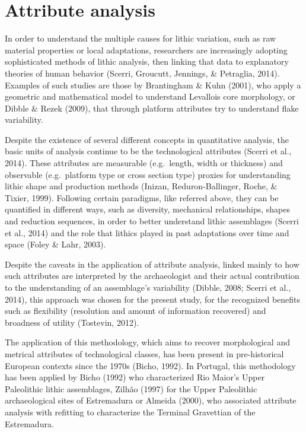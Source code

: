 \documentclass[12pt,twoside]{reedthesis}
\begin{document}
\hypertarget{attribute-analysis}{%
\section{Attribute analysis}\label{attribute-analysis}}

In order to understand the multiple causes for lithic variation, such as raw material properties or local adaptations, researchers are increasingly adopting sophisticated methods of lithic analysis, then linking that data to explanatory theories of human behavior (Scerri, Groucutt, Jennings, \& Petraglia, 2014). Examples of such studies are those by Brantingham \& Kuhn (2001), who apply a geometric and mathematical model to understand Levallois core morphology, or Dibble \& Rezek (2009), that through platform attributes try to understand flake variability.

Despite the existence of several different concepts in quantitative analysis, the basic units of analysis continue to be the technological attributes (Scerri et al., 2014). These attributes are measurable (e.g.~length, width or thickness) and observable (e.g.~platform type or cross section type) proxies for understanding lithic shape and production methods (Inizan, Reduron-Ballinger, Roche, \& Tixier, 1999). Following certain paradigms, like referred above, they can be quantified in different ways, such as diversity, mechanical relationships, shapes and reduction sequences, in order to better understand lithic assemblages (Scerri et al., 2014) and the role that lithics played in past adaptations over time and space (Foley \& Lahr, 2003).

Despite the caveats in the application of attribute analysis, linked mainly to how such attributes are interpreted by the archaeologist and their actual contribution to the understanding of an assemblage's variability (Dibble, 2008; Scerri et al., 2014), this approach was chosen for the present study, for the recognized benefits such as flexibility (resolution and amount of information recovered) and broadness of utility (Tostevin, 2012).

The application of this methodology, which aims to recover morphological and metrical attributes of technological classes, has been present in pre-historical European contexts since the 1970s (Bicho, 1992). In Portugal, this methodology has been applied by Bicho (1992) who characterized Rio Maior's Upper Paleolithic lithic assemblages, Zilhão (1997) for the Upper Paleolithic archaeological sites of Estremadura or Almeida (2000), who associated attribute analysis with refitting to characterize the Terminal Gravettian of the Estremadura.
\end{document}
